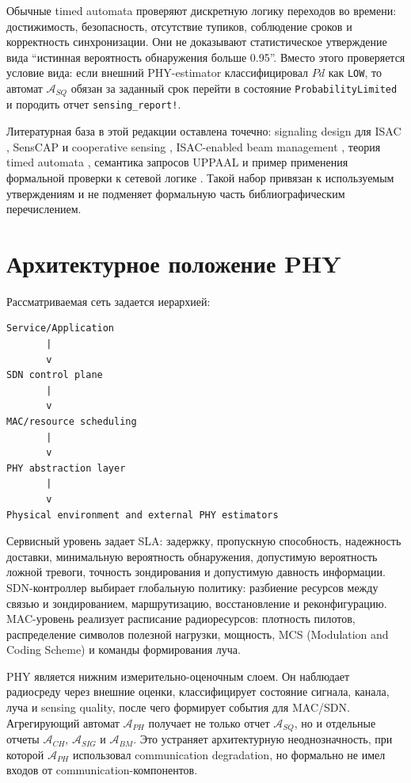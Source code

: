 \documentclass[10pt,a4paper]{article}
\newcommand{\code}[1]{\texttt{#1}}
\newcommand{\A}[1]{\mathcal{A}_{#1}}
\begin{document}
Обычные timed automata проверяют дискретную логику переходов во времени: достижимость, безопасность, отсутствие тупиков, соблюдение сроков и корректность синхронизации. Они не доказывают статистическое утверждение вида ``истинная вероятность обнаружения больше 0.95''. Вместо этого проверяется условие вида: если внешний PHY-estimator классифицировал \(Pd\) как \code{LOW}, то автомат \(\A{SQ}\) обязан за заданный срок перейти в состояние \code{ProbabilityLimited} и породить отчет \code{sensing\_report!}.

Литературная база в этой редакции оставлена точечно: signaling design для ISAC \cite{li2026rethinking}, SensCAP и cooperative sensing \cite{liu2024senscap,liu2026cooperative}, ISAC-enabled beam management \cite{huang2026beam}, теория timed automata \cite{alur1994timed}, семантика запросов UPPAAL \cite{uppaal2026queries} и пример применения формальной проверки к сетевой логике \cite{anand2007afdx}. Такой набор привязан к используемым утверждениям и не подменяет формальную часть библиографическим перечислением.

\section{Архитектурное положение PHY}

Рассматриваемая сеть задается иерархией:

\begin{verbatim}
Service/Application
       |
       v
SDN control plane
       |
       v
MAC/resource scheduling
       |
       v
PHY abstraction layer
       |
       v
Physical environment and external PHY estimators
\end{verbatim}

Сервисный уровень задает SLA: задержку, пропускную способность, надежность доставки, минимальную вероятность обнаружения, допустимую вероятность ложной тревоги, точность зондирования и допустимую давность информации. SDN-контроллер выбирает глобальную политику: разбиение ресурсов между связью и зондированием, маршрутизацию, восстановление и реконфигурацию. MAC-уровень реализует расписание радиоресурсов: плотность пилотов, распределение символов полезной нагрузки, мощность, MCS (Modulation and Coding Scheme) и команды формирования луча.

PHY является нижним измерительно-оценочным слоем. Он наблюдает радиосреду через внешние оценки, классифицирует состояние сигнала, канала, луча и sensing quality, после чего формирует события для MAC/SDN. Агрегирующий автомат \(\A{PH}\) получает не только отчет \(\A{SQ}\), но и отдельные отчеты \(\A{CH}\), \(\A{SIG}\) и \(\A{BM}\). Это устраняет архитектурную неоднозначность, при которой \(\A{PH}\) использовал communication degradation, но формально не имел входов от communication-компонентов.
\end{document}
